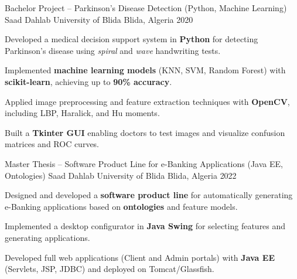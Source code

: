 \documentclass[11pt, a4paper]{awesome-cv}
\newif\ifprivatecv
\begin{document}
\makeatletter
\let\drawphoto\relax
\let\headertextwidth\relax
\let\headerphotowidth\relax
\makeatother

\ifprivatecv
	\address{\privateAddressEn}
\fi

\makecvheader[C]



\newpage



\begin{cventries}
	\cventry
	{Bachelor Project – Parkinson’s Disease Detection (Python, Machine Learning)}
	{Saad Dahlab University of Blida}
	{Blida, Algeria}
	{2020}
	{
		\begin{cvitems}
			\item {Developed a medical decision support system in \textbf{Python} for detecting Parkinson’s disease using \textit{spiral} and \textit{wave} handwriting tests.}
			\item {Implemented \textbf{machine learning models} (KNN, SVM, Random Forest) with \textbf{scikit-learn}, achieving up to \textbf{90\% accuracy}.}
			\item {Applied image preprocessing and feature extraction techniques with \textbf{OpenCV}, including LBP, Haralick, and Hu moments.}
			\item {Built a \textbf{Tkinter GUI} enabling doctors to test images and visualize confusion matrices and ROC curves.}
		\end{cvitems}
	}

	\cventry
	{Master Thesis – Software Product Line for e-Banking Applications (Java EE, Ontologies)}
	{Saad Dahlab University of Blida}
	{Blida, Algeria}
	{2022}
	{
		\begin{cvitems}
			\item {Designed and developed a \textbf{software product line} for automatically generating e-Banking applications based on \textbf{ontologies} and feature models.}
			\item {Implemented a desktop configurator in \textbf{Java Swing} for selecting features and generating applications.}
			\item {Developed full web applications (Client and Admin portals) with \textbf{Java EE} (Servlets, JSP, JDBC) and deployed on Tomcat/Glassfish.}
		\end{cvitems}
	}
\end{cventries}

\end{document}
